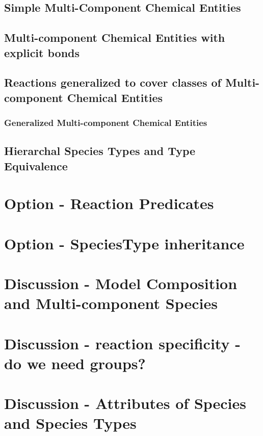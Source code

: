\documentclass{cekarticle}
\begin{document}
\subsection{Simple Multi-Component Chemical Entities}
\label{sec:multicomponentspecies}

\subsection{Multi-component Chemical Entities with explicit bonds}
\label{sec:explicitbonds}

\subsection{Reactions generalized to cover classes of Multi-component Chemical Entities}
\label{sec:generalizedreactions}

\subsubsection{Generalized Multi-component Chemical Entities}

\subsection{Hierarchal Species Types and Type Equivalence}

\section{Option - Reaction Predicates}

\section{Option - SpeciesType inheritance}

\section{Discussion - Model Composition and Multi-component Species}

\section{Discussion - reaction specificity - do we need groups?}

\section{Discussion - Attributes of Species and Species Types}
\end{document}
